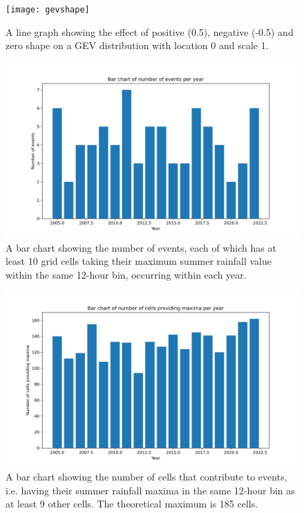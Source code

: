 \documentclass[12pt,a4paper,openany]{report}
\begin{document}
\begin{figure}[H]
    \centering
    \texttt{[image: gevshape]}
    \caption[Line graph for GEV distribution with different shape parameters.]{
       A line graph showing the effect of positive (0.5), negative (-0.5) and zero shape on a GEV
        distribution with location 0 and scale 1.}
    \label{fig:gevshape}
\end{figure}
\begin{figure}[H]
    \centering
    \includegraphics[width=150mm]{eventsyear}
    \caption[A bar chart showing the number of events occurring in each year.]{A bar chart showing the number of events,
        each of which has at least 10 grid cells taking their maximum summer rainfall value within the same 12-hour bin,
    occurring within each year.}
    \label{fig:eventsyear}
\end{figure}
\begin{figure}[H]
    \centering
    \includegraphics[width=150mm]{cellsyear}
    \caption[A bar chart showing the number of cells that contribute to events.]{
        A bar chart showing the number of cells that contribute to events,
        i.e. having their summer rainfall maxima in the same 12-hour bin as at least 9 other cells.
        The theoretical maximum is 185 cells.}
    \label{fig:cellsyear}
\end{figure}




\end{document}
